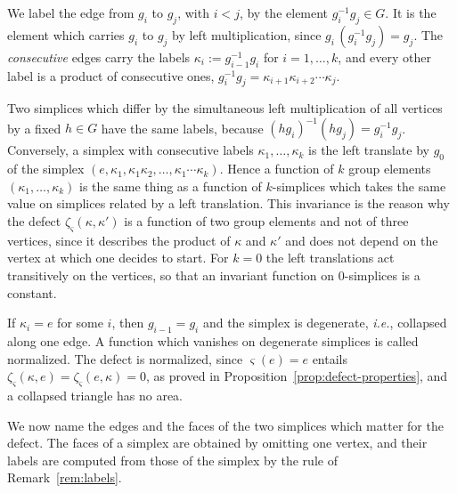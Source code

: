 \begin{remark}\label{rem:labels}
	We label the edge from $g_i$ to $g_j$, with $i<j$, by the element $g_i^{-1}g_j\in G$. It is the element which carries $g_i$ to $g_j$ by left multiplication, since $g_i\,(g_i^{-1}g_j)=g_j$. The \emph{consecutive} edges carry the labels $\kappa_i:=g_{i-1}^{-1}g_i$ for $i=1,\dots,k$, and every other label is a product of consecutive ones, $g_i^{-1}g_j=\kappa_{i+1}\kappa_{i+2}\cdots\kappa_j$.
	
	Two simplices which differ by the simultaneous left multiplication of all vertices by a fixed $h\in G$ have the same labels, because $(hg_i)^{-1}(hg_j)=g_i^{-1}g_j$. Conversely, a simplex with consecutive labels $\kappa_1,\dots,\kappa_k$ is the left translate by $g_0$ of the simplex $(e,\kappa_1,\kappa_1\kappa_2,\dots,\kappa_1\cdots\kappa_k)$. Hence a function of $k$ group elements $(\kappa_1,\dots,\kappa_k)$ is the same thing as a function of $k$-simplices which takes the same value on simplices related by a left translation. This invariance is the reason why the defect $\zeta_\varsigma(\kappa,\kappa')$ is a function of two group elements and not of three vertices, since it describes the product of $\kappa$ and $\kappa'$ and does not depend on the vertex at which one decides to start. For $k=0$ the left translations act transitively on the vertices, so that an invariant function on $0$-simplices is a constant.
	
	If $\kappa_i=e$ for some $i$, then $g_{i-1}=g_i$ and the simplex is degenerate, \textit{i.e.}, collapsed along one edge. A function which vanishes on degenerate simplices is called normalized. The defect is normalized, since $\varsigma(e)=e$ entails $\zeta_\varsigma(\kappa,e)=\zeta_\varsigma(e,\kappa)=0$, as proved in Proposition~\ref{prop:defect-properties}, and a collapsed triangle has no area.
\end{remark}

We now name the edges and the faces of the two simplices which matter for the defect. The faces of a simplex are obtained by omitting one vertex, and their labels are computed from those of the simplex by the rule of Remark~\ref{rem:labels}.

